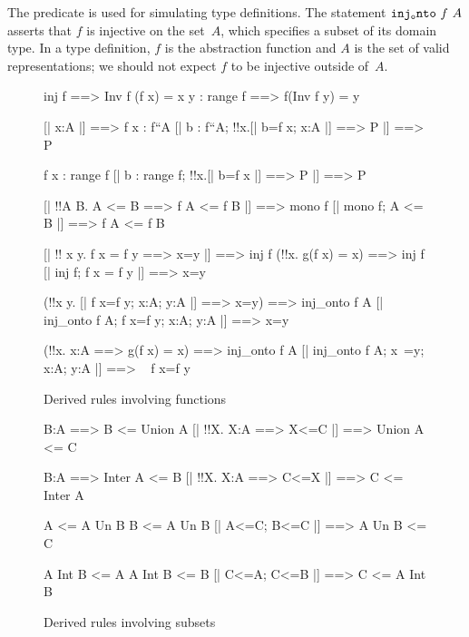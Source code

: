The predicate  is used for simulating type definitions.
The statement ${\tt inj_onto}~f~A$ asserts that $f$ is injective on the
set~$A$, which specifies a subset of its domain type.  In a type
definition, $f$ is the abstraction function and $A$ is the set of valid
representations; we should not expect $f$ to be injective outside of~$A$.

\begin{figure} \underscoreon
\begin{ttbox}
    inj f ==> Inv f (f x) = x
    y : range f ==> f(Inv f y) = y

%
     [| x:A |] ==> f x : f``A
     [| b : f``A;  !!x.[| b=f x;  x:A |] ==> P |] ==> P

     f x : range f
     [| b : range f;  !!x.[| b=f x |] ==> P |] ==> P

      [| !!A B. A <= B ==> f A <= f B |] ==> mono f
      [| mono f;  A <= B |] ==> f A <= f B

       [| !! x y. f x = f y ==> x=y |] ==> inj f
              (!!x. g(f x) = x) ==> inj f
       [| inj f; f x = f y |] ==> x=y

  (!!x y. [| f x=f y; x:A; y:A |] ==> x=y) ==> inj_onto f A
  [| inj_onto f A;  f x=f y;  x:A;  y:A |] ==> x=y

    (!!x. x:A ==> g(f x) = x) ==> inj_onto f A
    [| inj_onto f A;  x~=y;  x:A;  y:A |] ==> ~ f x=f y
\end{ttbox}
\caption{Derived rules involving functions} \label{hol-fun}
\end{figure}


\begin{figure} \underscoreon
\begin{ttbox}
     B:A ==> B <= Union A
     [| !!X. X:A ==> X<=C |] ==> Union A <= C

     B:A ==> Inter A <= B
  [| !!X. X:A ==> C<=X |] ==> C <= Inter A

       A <= A Un B
       B <= A Un B
        [| A<=C;  B<=C |] ==> A Un B <= C

      A Int B <= A
      A Int B <= B
    [| C<=A;  C<=B |] ==> C <= A Int B
\end{ttbox}
\caption{Derived rules involving subsets} \label{hol-subset}
\end{figure}


